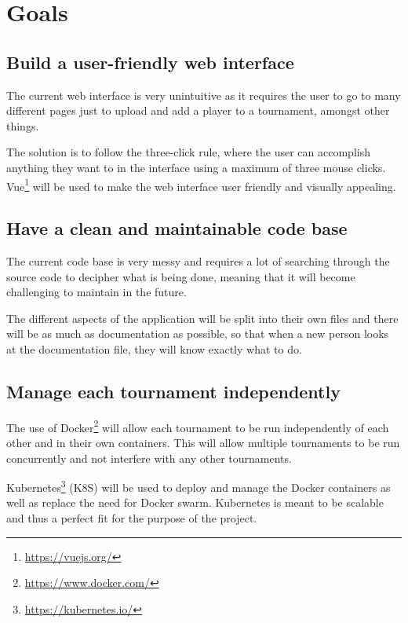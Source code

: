 \documentclass[a4paper, 12pt]{article}
\begin{document}
\section{Goals}

\subsection{Build a user-friendly web interface}

The current web interface is very unintuitive as it requires the user to go to
many different pages just to upload and add a player to a tournament, amongst
other things.

\vspace{0.8em}
The solution is to follow the three-click rule, where the user can accomplish
anything they want to in the interface using a maximum of three mouse clicks.
Vue\footnote{\url{https://vuejs.org/}} will be used to make the web interface
user friendly and visually appealing.

\subsection{Have a clean and maintainable code base}

The current code base is very messy and requires a lot of searching through the
source code to decipher what is being done, meaning that it will become challenging
to maintain in the future.

\vspace{0.8em}
The different aspects of the application will be split into their own files and
there will be as much as documentation as possible, so that when a new person
looks at the documentation file, they will know exactly what to do.

\subsection{Manage each tournament independently}

The use of Docker\footnote{\url{https://www.docker.com/}} will allow each
tournament to be run independently of each other and in their own containers.
This will allow multiple tournaments to be run concurrently and not interfere
with any other tournaments.

\vspace{0.8em}
Kubernetes\footnote{\url{https://kubernetes.io/}} (K8S) will be used to deploy
and manage the Docker containers as well as replace the need for Docker swarm.
Kubernetes is meant to be scalable and thus a perfect fit for the purpose of
the project.
\end{document}

